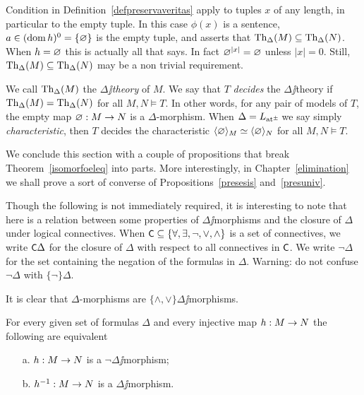 \documentclass[creche.tex]{subfiles}
\begin{document}
\begin{remark}\label{rmk_characteristic}
Condition  in Definition~\ref{defpreservaveritas} apply to tuples $x$ of any length, in particular to the empty tuple.
In this case $\phi(x)$ is a sentence, $a\in(\mathop{\rm dom} h)^0=\{\varnothing\}$ is the empty tuple, and  asserts that $\textrm{Th}_\Delta(M)\subseteq\textrm{Th}_\Delta(N)$.
When $h=\varnothing$ this is actually all that  says.
In fact $\varnothing^{|x|}=\varnothing$ unless $|x|=0$.
Still,  $\textrm{Th}_\Delta(M)\subseteq\textrm{Th}_\Delta(N)$ may be a non trivial requirement.\QED
\end{remark}


\begin{definition}\label{def_characteristic}
We call $\textrm{Th}_\Delta(M)$ the \emph{$\Delta\jj$theory} of $M$.
We say that $T$  \emph{decides\/} the $\Delta\jj$theory if $\textrm{Th}_\Delta(M)=\textrm{Th}_\Delta(N)$ for all $M,N\models T$.
In other words, for any pair of models of $T$, the empty map $\varnothing:M\to N$ is a $\Delta$-morphism.
When $\Delta=L_{{\tiny\rm at^\pm}}\hskip-.3ex$ we say simply \emph{characteristic}, then $T$ decides the characteristic $\langle\varnothing\rangle_M\simeq\langle\varnothing\rangle_N$ for all $M,N\models T$.\QED
\end{definition}



We conclude this section with a couple of propositions that break Theorem~\ref{isomorfoeleq} into parts.
More interestingly, in Chapter~\ref{elimination} we shall prove a sort of converse of Propositions~\ref{presesis} and~\ref{presuniv}.

Though the following is not immediately required, it is interesting to note that here is a relation between some properties of $\Delta\jj$morphisms and the closure of $\Delta$ under logical connectives.
When $\textsf{\small C}\subseteq\{\forall,\exists,\neg,\vee,\wedge\}$ is a set of connectives, we write \emph{$\textsf{\small C}\Delta$} for the closure of $\Delta$ with respect to all connectives in $\textsf{\small C}$.
We write \emph{$\neg\Delta$} for the set containing the negation of the formulas in $\Delta$.
Warning: do not confuse $\neg\Delta$ with $\{\neg\}\Delta$.

It is clear that $\Delta$-morphisms are  $\{\wedge,\vee\}\Delta\jj$morphisms.

\begin{proposition}\label{presneg}
For every given set of formulas $\Delta$ and every injective map $h:M\rightarrow N$ the following are equivalent
\begin{itemize}
\item[a.] $h:M\rightarrow N$ is a $\neg\Delta\jj$morphism;
\item[b.] $h^{-1}:M\rightarrow N$ is a $\Delta\jj$morphism.\QED
\end{itemize}
\end{proposition}
\end{document}
